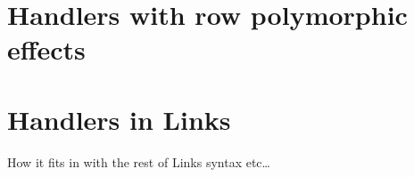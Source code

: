 \section{Handlers with row polymorphic effects}\label{sec:eval-abs}

\section{Handlers in Links}
How it fits in with the rest of Links syntax etc\dots